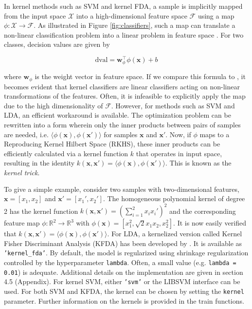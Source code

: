 \documentclass[utf8]{frontiersSCNS} %
\newcommand{\w}{\mathbf{w}}
\newcommand{\x}{\mathbf{x}}
\newcommand{\R}{\mathbb{R}}
\newcommand{\ttt}[1]{\texttt{#1}}
\begin{document}
In kernel methods such as SVM and kernel FDA, a sample is implicitly mapped from the input space $\mathcal{X}$ into a high-dimensional feature space $\mathcal{F}$ using a map $\phi:\mathcal{X}\rightarrow\mathcal{F}$. As illustrated in Figure \ref{fig:classifiers}, such a map can translate a non-linear classification problem into a linear problem in feature space \citep{Scholkopf2001LearningBeyond}. For two classes, decision values are given by

\begin{equation}
\label{eq:kernel_dval}
\text{dval} = \w_\phi^\top\phi(\x) + b
\end{equation}

where $\w_\phi$ is the weight vector in feature space. If we compare this formula to , it becomes evident that kernel classifiers are linear classifiers acting on non-linear transformations of the features. Often, it is  infeasible to explicitly apply the map due to the high dimensionality of $\mathcal{F}$.  However, for methods such as SVM and LDA, an efficient workaround is available. The optimization problem can be rewritten into a form wherein only the inner products between pairs of samples are needed, i.e. $\langle\phi(\x), \phi(\x')\rangle$ for samples $\x$ and $\x'$. Now, if $\phi$ maps to a Reproducing Kernel Hilbert Space (RKHS), these inner products can be efficiently calculated via a kernel function $k$ that operates in input space, resulting in the identity $k(\x,\x') = \langle\phi(\x), \phi(\x')\rangle$. This is known as the \textit{kernel trick}.

To give a simple example, consider two samples with  two-dimensional features, $\x = [x_1, x_2]$ and $\x' = [x_1', x_2']$. The homogeneous polynomial kernel of degree 2 has the kernel function $k(\x,\x') = (\sum_{i=1}^2 x_i x_i')^2$ and the corresponding feature map $\phi:\R^2\rightarrow\R^3$ with $\phi(\x)= [x_1^2, \sqrt{2}x_1 x_2, x_2^2]$. It is now easily verified that $k(\x,\x') = \langle\phi(\x), \phi(\x')\rangle$. For LDA, a kernelized version called Kernel Fisher Discriminant Analysis (KFDA) has been developed by \cite{Mika1999FisherKernels}. It is available as \ttt{'kernel\_fda'}. By default, the model is regularized using shrinkage regularization controlled by the hyperparameter \ttt{lambda}. Often, a small value (e.g. \ttt{lambda = 0.01}) is adequate. Additional details on the implementation are given in section 4.5 (Appendix).
For kernel SVM, either \ttt{'svm'} or the LIBSVM interface can be used. For both SVM and KFDA, the kernel can be chosen by setting the \ttt{kernel} parameter. Further information on the kernels is provided in the train functions.
\end{document}
